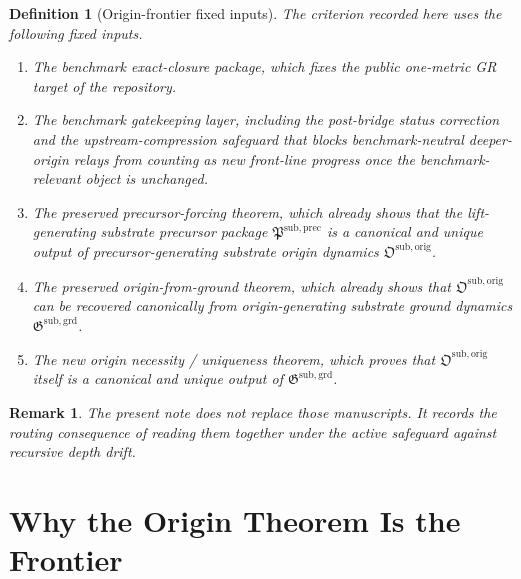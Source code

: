 \documentclass[11pt]{article}
\newcommand{\PrecursorPackage}{\mathfrak P^{\mathrm{sub,prec}}}
\newcommand{\OriginPackage}{\mathfrak O^{\mathrm{sub,orig}}}
\newcommand{\GroundPackage}{\mathfrak G^{\mathrm{sub,grd}}}
\newtheorem{definition}{Definition}
\newtheorem{remark}{Remark}
\begin{document}
\begin{definition}[Origin-frontier fixed inputs]
The criterion recorded here uses the following fixed inputs.
\begin{enumerate}
    \item The benchmark exact-closure package, which fixes the public one-metric GR target of the repository.
    \item The benchmark gatekeeping layer, including the post-bridge status correction and the upstream-compression safeguard that blocks benchmark-neutral deeper-origin relays from counting as new front-line progress once the benchmark-relevant object is unchanged.
    \item The preserved precursor-forcing theorem, which already shows that the lift-generating substrate precursor package \(\PrecursorPackage\) is a canonical and unique output of precursor-generating substrate origin dynamics \(\OriginPackage\).
    \item The preserved origin-from-ground theorem, which already shows that \(\OriginPackage\) can be recovered canonically from origin-generating substrate ground dynamics \(\GroundPackage\).
    \item The new origin necessity / uniqueness theorem, which proves that \(\OriginPackage\) itself is a canonical and unique output of \(\GroundPackage\).
\end{enumerate}
\end{definition}

\begin{remark}
The present note does not replace those manuscripts. It records the routing consequence of reading them together under the active safeguard against recursive depth drift.
\end{remark}

\section{Why the Origin Theorem Is the Frontier}
\end{document}
